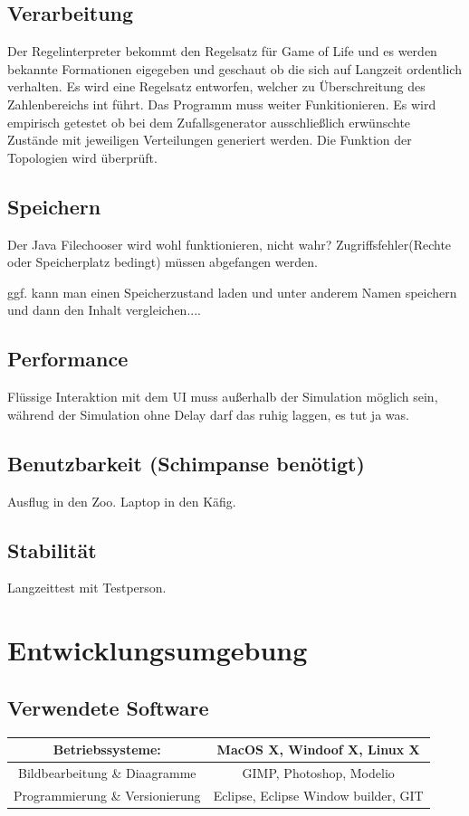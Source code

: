 \documentclass[11pt,a4paper]{article}
\begin{document}
\subsection{Verarbeitung}
Der Regelinterpreter bekommt den Regelsatz für Game of Life und es werden bekannte Formationen eigegeben und geschaut ob die sich auf Langzeit ordentlich verhalten. 
Es wird eine Regelsatz entworfen, welcher zu Überschreitung des Zahlenbereichs int führt. Das Programm muss weiter Funkitionieren.
Es wird empirisch getestet ob bei dem Zufallsgenerator ausschließlich erwünschte Zustände mit jeweiligen Verteilungen generiert werden.
Die Funktion der Topologien wird überprüft.

\subsection{Speichern}
Der Java Filechooser wird wohl funktionieren, nicht wahr?
Zugriffsfehler(Rechte oder Speicherplatz bedingt) müssen abgefangen werden.

ggf. kann man einen Speicherzustand laden und unter anderem Namen speichern und dann den Inhalt vergleichen....
\subsection{Performance}
Flüssige Interaktion mit dem UI muss außerhalb der Simulation möglich sein, während der Simulation ohne Delay darf das ruhig laggen, es tut ja was.
\subsection {Benutzbarkeit (Schimpanse benötigt)}
Ausflug in den Zoo. Laptop in den Käfig.
\subsection {Stabilität}
Langzeittest mit Testperson.
\section{Entwicklungsumgebung}
\subsection{Verwendete Software}
\begin{tabular}{|c|c|}
\hline
Betriebssysteme:     &  MacOS X, Windoof X, Linux X
  \\
     \hline
     Bildbearbeitung  \&  Diaagramme & 
         GIMP, Photoshop, Modelio
 \\
     \hline
     Programmierung  \& Versionierung & 
          Eclipse, 
          Eclipse Window builder,
          GIT\\
     \hline
\end{tabular}
\end{document}
